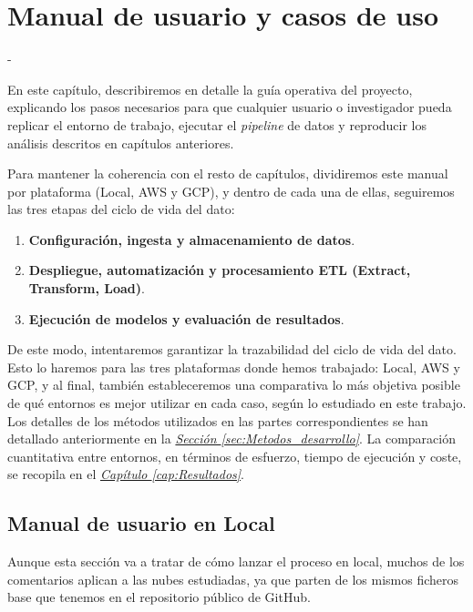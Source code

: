 \chapter{Manual de usuario y casos de uso}
\label{cap:Capitulo_5_manual_usuario}

-

En este capítulo, describiremos en detalle la guía operativa del proyecto, explicando los pasos necesarios para que cualquier usuario o investigador pueda replicar el entorno de trabajo, ejecutar el \textit{pipeline} de datos y reproducir los análisis descritos en capítulos anteriores. 

Para mantener la coherencia con el resto de capítulos, dividiremos este manual por plataforma (Local, AWS y GCP), y dentro de cada una de ellas, seguiremos las tres etapas del ciclo de vida del dato:
\begin{enumerate}
	\item \textbf{Configuración, ingesta y almacenamiento de datos}.
	\item \textbf{Despliegue, automatización y procesamiento ETL (Extract, Transform, Load)}.
	\item \textbf{Ejecución de modelos y evaluación de resultados}.
\end{enumerate}

De este modo, intentaremos garantizar la trazabilidad del ciclo de vida del dato. Esto lo haremos para las tres plataformas donde hemos trabajado: Local, AWS y GCP, y al final, también estableceremos una comparativa lo más objetiva posible de qué entornos es mejor utilizar en cada caso, según lo estudiado en este trabajo. Los detalles de los métodos utilizados en las partes correspondientes se han detallado anteriormente en la \hyperref[sec:Metodos_desarrollo]{\textit{Sección \ref*{sec:Metodos_desarrollo}}}. La comparación cuantitativa entre entornos, en términos de esfuerzo, tiempo de ejecución y coste, se recopila en el \hyperref[cap:Resultados]{\textit{Capítulo \ref*{cap:Resultados}}}.

\section{Manual de usuario en Local}

Aunque esta sección va a tratar de cómo lanzar el proceso en local, muchos de los comentarios aplican a las nubes estudiadas, ya que parten de los mismos ficheros base que tenemos en el repositorio público de GitHub.

